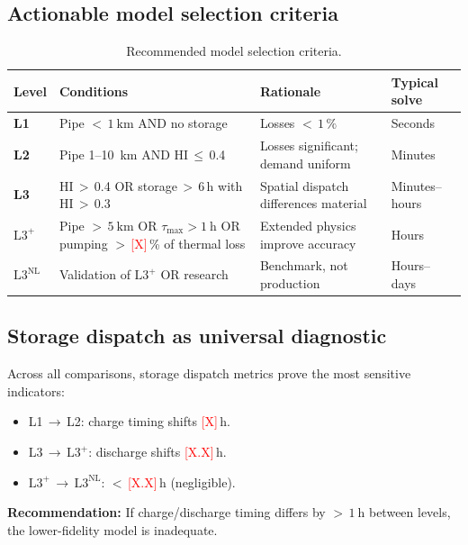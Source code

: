 \documentclass[review,3p]{elsarticle}
\newcommand{\placeholder}[1]{\textcolor{red}{[#1]}}
\newcommand{\Lplus}{\mathrm{L3}^{+}}
\newcommand{\Lnl}{\mathrm{L3}^{\mathrm{NL}}}
\begin{document}
\subsection{Actionable model selection criteria}
\label{sec:disc_criteria}

\begin{table}[!htbp]
\centering
\caption{Recommended model selection criteria.}
\label{tab:criteria}
\begin{tabular}{@{} l p{6.0cm} p{3.5cm} l @{}}
\toprule
Level & Conditions & Rationale & Typical solve \\
\midrule
\textbf{L1}
  & Pipe ${<}\,\SI{1}{\kilo\metre}$ AND no storage
  & Losses ${<}\,1\,\%$
  & Seconds \\[6pt]
\textbf{L2}
  & Pipe 1--\SI{10}{\kilo\metre} AND HI\,$\leq$\,0.4
  & Losses significant; demand uniform
  & Minutes \\[6pt]
\textbf{L3}
  & HI\,$>$\,0.4 OR storage\,$>$\,6\,h with HI\,$>$\,0.3
  & Spatial dispatch differences material
  & Minutes--hours \\[6pt]
\textbf{$\Lplus$}
  & Pipe ${>}\,\SI{5}{\kilo\metre}$ OR $\tau_{\max} > \SI{1}{\hour}$
    OR pumping ${>}\,$\placeholder{X}\,\% of thermal loss
  & Extended physics improve accuracy
  & Hours \\[6pt]
\textbf{$\Lnl$}
  & Validation of $\Lplus$ OR research
  & Benchmark, not production
  & Hours--days \\
\bottomrule
\end{tabular}
\end{table}

\subsection{Storage dispatch as universal diagnostic}
\label{sec:disc_storage}

Across all comparisons, storage dispatch metrics prove the most
sensitive indicators:
%
\begin{itemize}[nosep]
  \item L1\,$\to$\,L2: charge timing shifts \placeholder{X}\,h.
  \item L3\,$\to$\,$\Lplus$: discharge shifts \placeholder{X.X}\,h.
  \item $\Lplus$\,$\to$\,$\Lnl$:
        ${<}\,$\placeholder{X.X}\,h (negligible).
\end{itemize}

\textbf{Recommendation:} If charge/discharge timing differs by
${>}\,\SI{1}{\hour}$ between levels, the lower-fidelity model is
inadequate.
\end{document}
